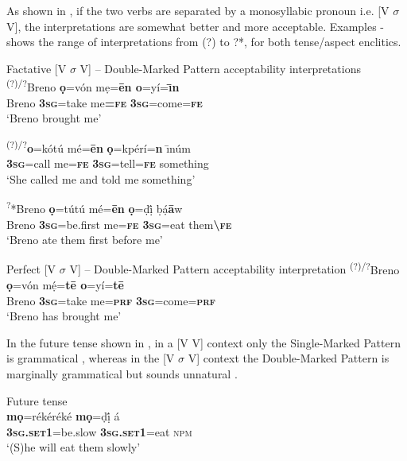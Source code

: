 \documentclass[output=paper]{langsci/langscibook}
\begin{document}
As shown in , if the two verbs are separated by a monosyllabic pronoun i.e. [V $\sigma $ V], the interpretations are somewhat better and more acceptable. Examples - shows the range of interpretations from (?) to ?*, for both tense/aspect enclitics.



\ea
{Factative [V $\sigma $ V] – Double-Marked Pattern acceptability interpretations} \\
\gll   \textsuperscript{(?)/?}Breno  \textbf{ọ}=vón  mẹ=\textbf{\=en  o}=yí=\textbf{\={\i}n}\\
         Breno  \textbf{\textsc{3}\textsc{sg}}=take  me\textbf{=}\textbf{\textsc{fe}} \textbf{\textsc{3sg}}=come=\textbf{\textsc{fe}}\\
\glt ‘Breno brought me’
\z

\ea
\gll   \textsuperscript{(?)/?}\textbf{o}=kótú    mé=\textbf{\=en}   \textbf{ọ}=kpérí=\textbf{n}   \={\i}núm\\
         \textbf{\textsc{3sg}}=call    me=\textbf{\textsc{fe}} \textbf{\textsc{3sg}}=tell=\textbf{\textsc{fe}}  something\\
\glt ‘She called me and told me something’
\z

\ea
\gll   \textsuperscript{?}*Breno   \textbf{ọ}=tútú     mé=\textbf{ēn}  \textbf{ọ}=ḍị́   ḅạ́\textbf{ā}w\\
         Breno  \textbf{\textsc{3sg}}=be.first  me=\textbf{\textsc{fe   3sg}}=eat  them\textbf{{\textbackslash}}\textbf{\textsc{fe}}\\
\glt ‘Breno ate them first before me’
\z

\ea
{Perfect [V $\sigma $ V] – Double-Marked Pattern acceptability interpretation}
\gll  \textsuperscript{(?)/?}Breno   \textbf{ọ}=vón     mẹ́=\textbf{t\=e     o}=yí=\textbf{t\=e}\\
       Breno   \textbf{\textsc{3sg}}=take   me=\textbf{\textsc{prf}} \textbf{\textsc{3sg}}=come=\textbf{\textsc{prf}}\\
\glt ‘Breno has brought me’ 
\z

In the future tense shown in , in a [V V] context only the Single-Marked Pattern is grammatical , whereas in the [V $\sigma $ V] context the Double-Marked Pattern is marginally grammatical but sounds unnatural . 

\ea
{Future tense}\\
\gll   *\textbf{mọ}=rékéréké    \textbf{mọ}=ḍị́       á    \\
     \textbf{\textsc{3sg.set1}}=be.slow  \textbf{\textsc{3sg}}\textbf{.}\textbf{\textsc{set1}}=eat  \textsc{npm}\\
\glt ‘(S)he will eat them slowly’
\z
\end{document}
